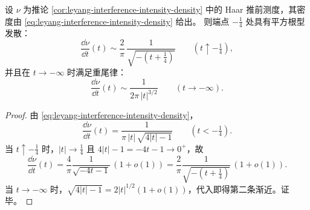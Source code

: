 \begin{corollary}[端点奇性指数与重尾指数]\label{cor:leyang-pushforward-density-asymptotics}
设 \(\nu\) 为推论 \ref{cor:leyang-interference-intensity-density} 中的 Haar 推前测度，其密度由 \eqref{eq:leyang-interference-intensity-density} 给出。
则端点 \(-\tfrac14\) 处具有平方根型发散：
\[
\frac{\dd\nu}{\dd t}(t)\sim \frac{2}{\pi}\,\frac{1}{\sqrt{-(t+\tfrac14)}}\qquad(t\uparrow-\tfrac14),
\]
并且在 \(t\to-\infty\) 时满足重尾律：
\[
\frac{\dd\nu}{\dd t}(t)\sim \frac{1}{2\pi\,|t|^{3/2}}\qquad(t\to-\infty).
\]
\end{corollary}
\begin{proof}
由 \eqref{eq:leyang-interference-intensity-density}，
\[
\frac{\dd\nu}{\dd t}(t)=\frac{1}{\pi\,|t|\,\sqrt{4|t|-1}}\qquad(t<-\tfrac14).
\]
当 \(t\uparrow-\tfrac14\) 时，\(|t|\to \tfrac14\) 且 \(4|t|-1=-4t-1\to 0^+\)，故
\[
\frac{\dd\nu}{\dd t}(t)
=\frac{4}{\pi}\frac{1}{\sqrt{-4t-1}}\,(1+o(1))
=\frac{2}{\pi}\frac{1}{\sqrt{-(t+\tfrac14)}}\,(1+o(1)).
\]
当 \(t\to-\infty\) 时，\(\sqrt{4|t|-1}=2|t|^{1/2}(1+o(1))\)，代入即得第二条渐近。证毕。
\end{proof}

\endinput
